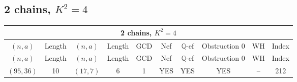 \subsection{2 chains, \(K^2 = 4\)}
\begin{longtable}{|c|c|c|c|c|c|c|c|c|c|}
\hline
\multicolumn{10}{|c|}{2 chains, $K^2 = 4$}\\
\hline
$(n,a)$ & Length & $(n,a)$ & Length & GCD & Nef & $\mathbb Q$-ef & Obstruction 0 & WH & Index\\
\hline
\endfirsthead

\hline
$(n,a)$ & Length & $(n,a)$ & Length & GCD & Nef & $\mathbb Q$-ef & Obstruction 0 & WH & Index\\
\hline
\endhead
\hline
\endfoot

$(95, 36)$ & 10 & $(17, 7)$ & 6 & 1 & YES & YES & YES & -- & 212
\end{longtable}
